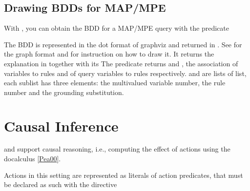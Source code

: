 \documentclass[letterpaper,10pt,english]{sphinxmanual}
\begin{document}
\subsection{Drawing BDDs for MAP/MPE}
\label{\detokenize{index:drawing-bdds-for-map-mpe}}
\sphinxAtStartPar
With , you can obtain the BDD for a MAP/MPE query with the predicate

\begin{sphinxVerbatim}[commandchars=\\\{\}]
          
\end{sphinxVerbatim}

\sphinxAtStartPar
The BDD is represented in the dot format of graphviz and returned in . See {\hyperref[\detokenize{index:drawing-bdds}]{}}
for the graph format and for instruction on how to draw it.
It returns the explanation in  together with its 
The predicate returns  and , the association of variables to rules
and of query variables to rules respectively.
 and  are lists of list, each sublist has three elements:
the multivalued variable number,
the rule number and the grounding substitution.


\section{Causal Inference}
\label{\detokenize{index:causal-inference}}
\sphinxAtStartPar
{} and  support causal reasoning, i.e., computing the effect of actions using the do\sphinxhyphen{}calculus {[}\hyperlink{cite.index:id62}{Pea00}{]}.

\sphinxAtStartPar
Actions in this setting are represented as literals of action predicates, that must be declared as such with the directive
\end{document}
